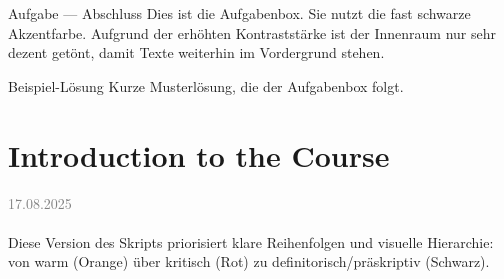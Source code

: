 \documentclass[11pt,a4paper,oneside]{article}
\newcommand{\lessondate}[1]{
	\noindent\hfill\textcolor{gray}{\textsc{#1}} \\
	\vspace{0.5cm}
}
\begin{document}
	\begin{task}{Aufgabe — Abschluss}
		Dies ist die Aufgabenbox. Sie nutzt die fast schwarze Akzentfarbe. Aufgrund der erhöhten Kontraststärke ist der Innenraum nur sehr dezent getönt, damit Texte weiterhin im Vordergrund stehen.
	\end{task}
	
	\begin{solution}{Beispiel-Lösung}
		Kurze Musterlösung, die der Aufgabenbox folgt.
	\end{solution}
	
	\clearpage
	\section{Introduction to the Course}
	\lessondate{17.08.2025}\\
	Diese Version des Skripts priorisiert klare Reihenfolgen und visuelle Hierarchie: von warm (Orange) über kritisch (Rot) zu definitorisch/präskriptiv (Schwarz).
	
	
\end{document}

